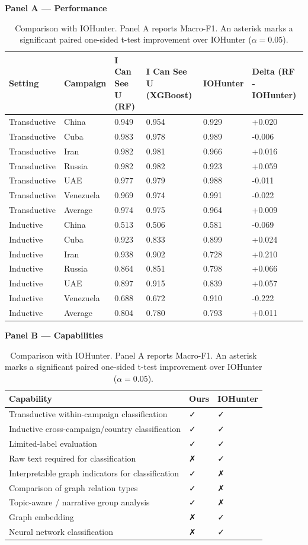 \begin{table}
\centering
\caption{Comparison with IOHunter. Panel A reports Macro-F1. An asterisk marks a significant paired one-sided t-test improvement over IOHunter ($\alpha=0.05$).}
\textbf{Panel A — Performance}
\begin{tabular}{llllll}
\toprule
Setting & Campaign & I Can See U (RF) & I Can See U (XGBoost) & IOHunter & Delta (RF - IOHunter) \\
\midrule
Transductive & China & 0.949 & 0.954 & 0.929 & +0.020 \\
Transductive & Cuba & 0.983 & 0.978 & 0.989 & -0.006 \\
Transductive & Iran & 0.982 & 0.981 & 0.966 & +0.016 \\
Transductive & Russia & 0.982 & 0.982 & 0.923 & +0.059 \\
Transductive & UAE & 0.977 & 0.979 & 0.988 & -0.011 \\
Transductive & Venezuela & 0.969 & 0.974 & 0.991 & -0.022 \\
Transductive & Average & 0.974 & 0.975 & 0.964 & +0.009 \\
Inductive & China & 0.513 & 0.506 & 0.581 & -0.069 \\
Inductive & Cuba & 0.923 & 0.833 & 0.899 & +0.024 \\
Inductive & Iran & 0.938 & 0.902 & 0.728 & +0.210 \\
Inductive & Russia & 0.864 & 0.851 & 0.798 & +0.066 \\
Inductive & UAE & 0.897 & 0.915 & 0.839 & +0.057 \\
Inductive & Venezuela & 0.688 & 0.672 & 0.910 & -0.222 \\
Inductive & Average & 0.804 & 0.780 & 0.793 & +0.011 \\
\bottomrule
\end{tabular}
\textbf{Panel B — Capabilities}
\begin{tabular}{lll}
\toprule
Capability & Ours & IOHunter \\
\midrule
Transductive within-campaign classification & ✓ & ✓ \\
Inductive cross-campaign/country classification & ✓ & ✓ \\
Limited-label evaluation & ✓ & ✓ \\
Raw text required for classification & ✗ & ✓ \\
Interpretable graph indicators for classification & ✓ & ✗ \\
Comparison of graph relation types & ✓ & ✗ \\
Topic-aware / narrative group analysis & ✓ & ✗ \\
Graph embedding & ✗ & ✓ \\
Neural network classification & ✗ & ✓ \\
\bottomrule
\end{tabular}
\end{table}
